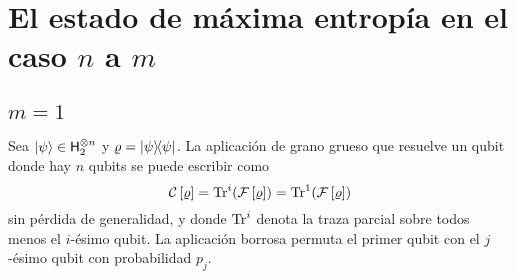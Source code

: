 \section{El estado de máxima entropía en el caso $n$ a $m$}
\subsection{$m=1$}
Sea $\ket{\psi}\in{\sf H}_{2}^{\otimes n}$ y $\varrho=\dyad{\psi}$. La aplicación de grano grueso que resuelve un qubit donde hay $n$ qubits se puede escribir como
\begin{equation*}
    \mathcal{C}\left[\varrho\right]=\Tr^{i}(\mathcal{F}\left[\varrho\right])=\Tr^{1}(\mathcal{F}\left[\varrho\right])
\end{equation*}
sin pérdida de generalidad, y donde $\Tr^{i}$ denota la traza parcial sobre todos menos el $i$-ésimo qubit. La aplicación borrosa permuta el primer qubit con el $j$-ésimo qubit con probabilidad $p_{j}$.